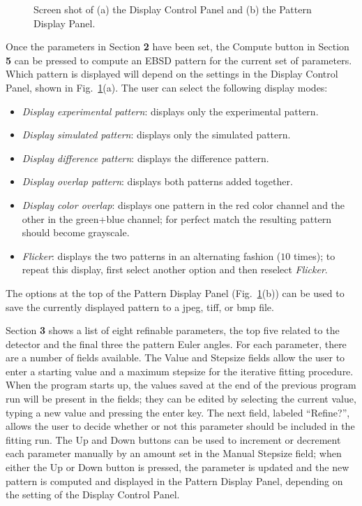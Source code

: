 \documentclass[DIV=calc, paper=letter, fontsize=11pt]{scrartcl}	 %
\begin{document}
\begin{figure}[t]
\centering\leavevmode
\epsfxsize=5.0in
\caption{\label{fig:Efitcontrols}Screen shot of (a) the Display Control Panel and (b) the Pattern Display Panel.}
\end{figure}

Once the parameters in Section \textbf{2} have been set, the \textsf{Compute} button in Section \textbf{5} can be pressed to compute an EBSD pattern for
the current set of parameters.  Which pattern is displayed will depend on the settings in the \textsf{Display Control Panel}, shown in Fig.~\ref{fig:Efitcontrols}(a).
The user can select the following display modes:
\begin{itemize}
\item \textit{Display experimental pattern}: displays only the experimental pattern.
\item \textit{Display simulated pattern}: displays only the simulated pattern.
\item \textit{Display difference pattern}: displays the difference pattern.
\item \textit{Display overlap pattern}: displays both patterns added together.
\item \textit{Display color overlap}: displays one pattern in the red color channel and the other in the green+blue channel; for perfect match the resulting pattern should become grayscale.
\item \textit{Flicker}: displays the two patterns in an alternating fashion ($10$ times); to repeat this display, first select another option and then reselect \textit{Flicker}.
\end{itemize}
The options at the top of the Pattern Display Panel (Fig.~\ref{fig:Efitcontrols}(b)) can be used to save the currently displayed pattern to a jpeg, tiff, or bmp file.

Section \textbf{3} shows a list of eight refinable parameters, the top five related to the detector and the final three the pattern Euler angles. For each parameter, there are a number of fields available.  The Value and Stepsize fields allow the user to enter a starting value and a maximum stepsize for the iterative fitting procedure. When the program starts up, the values saved at the end of the previous program run will be present in the fields; they can be edited by selecting the current value, typing a new value and pressing the enter key.  The next field, labeled ``Refine?'', allows the user to decide whether or not this parameter should be included in the fitting run.
The Up and Down buttons can be used to increment or decrement each parameter manually by an amount set in the Manual Stepsize field; when either the Up or Down button is pressed, the parameter is updated and the new pattern is computed and displayed in the Pattern Display Panel, depending on the setting of the Display Control Panel.
\end{document}
